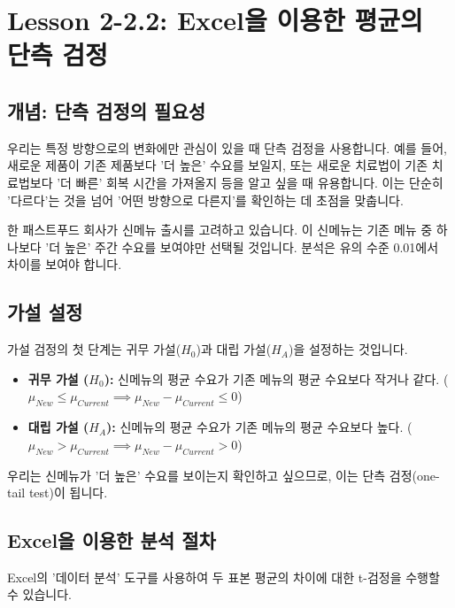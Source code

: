 \documentclass[11pt,a4paper]{book}
\theoremstyle{definition}
\begin{document}
\section{Lesson 2-2.2: Excel을 이용한 평균의 단측 검정}

\subsection{개념: 단측 검정의 필요성}
우리는 특정 방향으로의 변화에만 관심이 있을 때 단측 검정을 사용합니다. 예를 들어, 새로운 제품이 기존 제품보다 '더 높은' 수요를 보일지, 또는 새로운 치료법이 기존 치료법보다 '더 빠른' 회복 시간을 가져올지 등을 알고 싶을 때 유용합니다. 이는 단순히 '다르다'는 것을 넘어 '어떤 방향으로 다른지'를 확인하는 데 초점을 맞춥니다.

\begin{examplebox}[title=시나리오: 패스트푸드 신메뉴 출시]
한 패스트푸드 회사가 신메뉴 출시를 고려하고 있습니다. 이 신메뉴는 기존 메뉴 중 하나보다 '더 높은' 주간 수요를 보여야만 선택될 것입니다. 분석은 유의 수준 0.01에서 차이를 보여야 합니다.
\end{examplebox}

\subsection{가설 설정}
가설 검정의 첫 단계는 귀무 가설($H_0$)과 대립 가설($H_A$)을 설정하는 것입니다.

\begin{itemize}
    \item \textbf{귀무 가설 ($H_0$):} 신메뉴의 평균 수요가 기존 메뉴의 평균 수요보다 작거나 같다.
    ($\mu_{New} \le \mu_{Current} \implies \mu_{New} - \mu_{Current} \le 0$)
    \item \textbf{대립 가설 ($H_A$):} 신메뉴의 평균 수요가 기존 메뉴의 평균 수요보다 높다.
    ($\mu_{New} > \mu_{Current} \implies \mu_{New} - \mu_{Current} > 0$)
\end{itemize}
우리는 신메뉴가 '더 높은' 수요를 보이는지 확인하고 싶으므로, 이는 단측 검정(one-tail test)이 됩니다.

\subsection{Excel을 이용한 분석 절차}
Excel의 '데이터 분석' 도구를 사용하여 두 표본 평균의 차이에 대한 t-검정을 수행할 수 있습니다.
\end{document}
